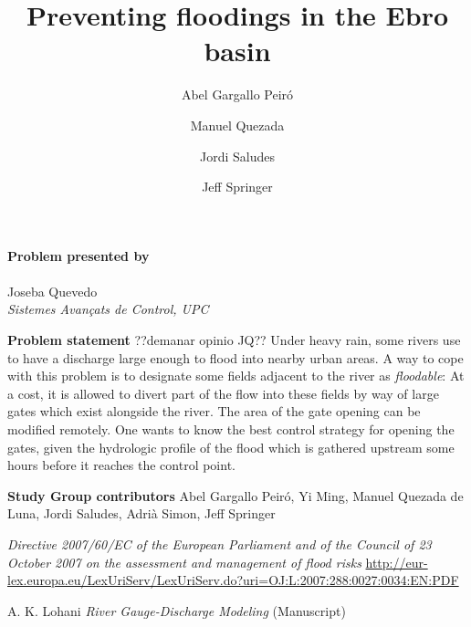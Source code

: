 \documentclass[a4paper,12pt,english]{article}
\title{Preventing floodings in the Ebro basin}
\author{Abel Gargallo Peir\'o\and
Manuel Quezada\and
Jordi Saludes\and
Jeff Springer}
\begin{document}
\maketitle

\begin{center}
\textbf{Problem presented by} \\ \ \\ \large Joseba Quevedo \\ \normalsize \textit{Sistemes Avan{\c c}ats de Control, UPC}
\end{center}

\begin{center}
\textbf{Problem statement}
??demanar opinio JQ??
Under heavy rain, some rivers use to have a discharge large enough to flood into
nearby urban areas.
A way to cope with this problem is to designate some fields adjacent to the river as \emph{floodable}:
At a cost, it is allowed to divert part of the flow into these fields by way of large gates
which exist alongside the river. The area of the gate opening can be modified remotely.
One wants to know the best control strategy for opening the gates, given the hydrologic profile
of the flood which is gathered upstream some hours before it reaches the control point.
\end{center}



\begin{center}
\textbf{Study Group contributors}
Abel Gargallo Peir\'o,
Yi Ming,
Manuel Quezada de Luna,
Jordi Saludes,
Adri\`a Simon,
Jeff Springer
\end{center}

\newpage


\begin{thebibliography}{99}
\emph{Directive 2007/60/EC of the European Parliament and of the Council of 23 October 2007 on the assessment and management of flood risks}
\url{http://eur-lex.europa.eu/LexUriServ/LexUriServ.do?uri=OJ:L:2007:288:0027:0034:EN:PDF}

A. K. Lohani \emph{River Gauge-Discharge Modeling} (Manuscript)
\end{thebibliography}
\end{document}
